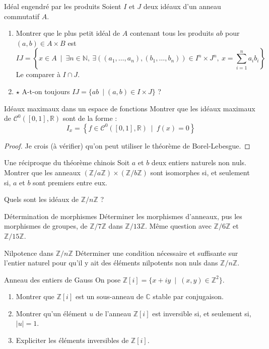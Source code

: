 \documentclass[french,a4paper]{article}
\newcommand{\N}{\mathbb{N}}
\newcommand{\Z}{\mathbb{Z}}
\newcommand{\R}{\mathbb{R}}
\newcommand{\C}{\mathbb{C}}
\theoremstyle{plain}
\theoremstyle{definition}
\theoremstyle{remark}
\begin{document}
\begin{ex}[Moulin.34]{Idéal engendré par les produits}
	Soient $I$ et $J$ deux idéaux d'un anneau commutatif $A$.
	\begin{enumerate}
		\item Montrer que le plus petit idéal de $A$ contenant tous les produits $ab$ pour $(a,b)\in A\times B$ est $$IJ=\left\{x\in A\ \mid\ \exists n\in\N,\ \exists((a_1,\ldots,a_n),(b_1,\ldots,b_n))\in I^n\times J^n,\ x=\sum_{i=1}^{n}a_ib_i\right\}$$ Le comparer à $I\cap J$.
		\item $\star$ A-t-on toujours $IJ=\{ab\ \mid (a,b)\in I\times J\}$ ?
	\end{enumerate}
\end{ex}

\begin{ex}[X]{Idéaux maximaux dans un espace de fonctions}
	Montrer que les idéaux maximaux de $\mathcal{C}^0([0,1],\R)$ sont de la forme : $$I_x=\left\{f\in\mathcal{C}^0([0,1],\R)\ \mid\ f(x)=0\right\}$$
\end{ex}

\begin{proof}
	Je crois (à vérifier) qu'on peut utiliser le théorème de Borel-Lebesgue.
\end{proof}

\begin{ex}[Moulin.35]{Une réciproque du théorème chinois}
	Soit $a$ et $b$ deux entiers naturels non nuls. Montrer que les anneaux $(\Z/a\Z)\times(\Z/b\Z)$ sont isomorphes si, et seulement si, $a$ et $b$ sont premiers entre eux.
\end{ex}

\begin{ex}[Moulin.36]{}
	Quels sont les idéaux de $\Z/n\Z$ ?
\end{ex}

\begin{ex}[Moulin.37]{Détermination de morphismes}
	Déterminer les morphismes d'anneaux, pus les morphismes de groupes, de $\Z/7\Z$ dans $\Z/13\Z$. Même question avec $\Z/6\Z$ et $\Z/15\Z$.
\end{ex}

\begin{ex}[Moulin.38]{Nilpotence dans $\Z/n\Z$}
	Déterminer une condition nécessaire et suffisante sur l'entier naturel pour qu'il y ait des éléments nilpotents non nuls dans $\Z/n\Z$.
\end{ex}

\begin{ex}[Morlot]{Anneau des entiers de Gauss}
	On pose $\Z[i]=\{x+iy\ \mid\ (x,y)\in\Z^2\}$.
	\begin{enumerate}
		\item Montrer que $\Z[i]$ est un sous-anneau de $\C$ stable par conjugaison.
		\item Montrer qu'un élément $u$ de l'anneau $\Z[i]$ est inversible si, et seulement si, $\lvert u\rvert=1$.
		\item Expliciter les éléments inversibles de $\Z[i]$.
	\end{enumerate}
\end{ex}
\end{document}
